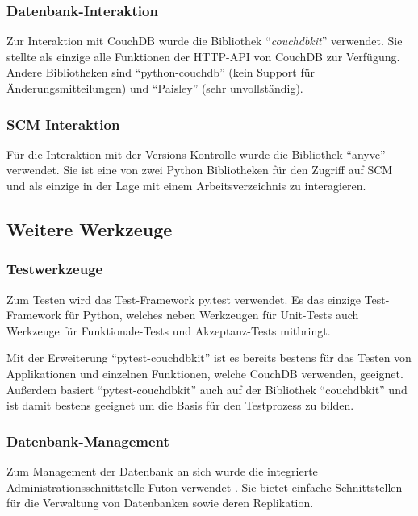 \subsubsection{Datenbank-Interaktion}

Zur Interaktion mit CouchDB wurde die Bibliothek ``\emph{couchdbkit}'' \cite{couchdbkit:website} verwendet.
Sie stellte als einzige alle Funktionen der HTTP-API von CouchDB zur Verfügung.
Andere Bibliotheken sind ``python-couchdb'' (kein Support für Änderungsmitteilungen)
und ``Paisley'' (sehr unvollständig).

\subsubsection{SCM Interaktion}

Für die Interaktion mit der Versions-Kontrolle wurde die Bibliothek ``anyvc'' \cite{anyvc:website} verwendet.
Sie ist eine von zwei Python Bibliotheken für den Zugriff auf SCM
und als einzige in der Lage mit einem Arbeitsverzeichnis zu interagieren.

\subsection{Weitere Werkzeuge}

\subsubsection{Testwerkzeuge}

Zum Testen wird das Test-Framework py.test \cite{pytest:website} verwendet.
Es das einzige Test-Framework für Python,
welches neben Werkzeugen für Unit-Tests auch Werkzeuge für
Funktionale-Tests und Akzeptanz-Tests mitbringt.

Mit der Erweiterung ``pytest-couchdbkit'' \cite{pytest:couchdbkit} ist es bereits
bestens für das Testen von Applikationen und einzelnen Funktionen,
welche CouchDB verwenden, geeignet.
Außerdem basiert ``pytest-couchdbkit'' auch auf der Bibliothek ``couchdbkit''
und ist damit bestens geeignet um die Basis für den Testprozess zu bilden.

\subsubsection{Datenbank-Management}

Zum Management der Datenbank an sich wurde die integrierte Administrationsschnittstelle Futon verwendet \cite{couchdb:futon}.
Sie bietet einfache Schnittstellen für die Verwaltung von Datenbanken sowie deren Replikation.

